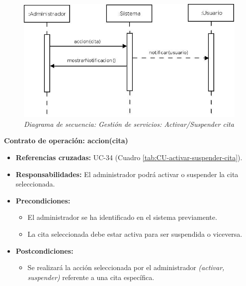\begin{figure}
\centering
  \includegraphics[scale=.55]{img/secuencias/gestion-servicios-suspender-activar-cita.jpeg}
  \caption{\textit{Diagrama de secuencia: Gestión de servicios: Activar/Suspender cita}}
  \label{fig:secuencia-gestion-servicios-suspender-activar-cita}
\end{figure}

\textbf{Contrato de operación: accion(cita)}
\begin{itemize}
\item \textbf{Referencias cruzadas:} UC-34 (Cuadro \ref{tab:CU-activar-suspender-cita}).
\item \textbf{Responsabilidades:} El administrador podrá activar o suspender la cita seleccionada.
\item \textbf{Precondiciones:} 
 \begin{itemize}
\item El administrador se ha identificado en el sistema previamente.
\item La cita seleccionada debe estar activa para ser suspendida o viceversa.
\end {itemize}
\item \textbf{Postcondiciones:} 
 \begin{itemize}
\item Se realizará la acción seleccionada por el administrador \textit{(activar, suspender)} referente a una cita específica.
\end {itemize}
\end {itemize}


